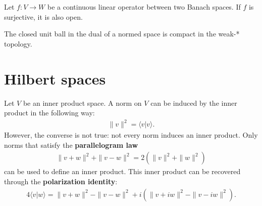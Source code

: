     \begin{theorem}
        Let $f:V\rightarrow W$ be a continuous linear operator between two Banach spaces. If $f$ is surjective, it is also open.
    \end{theorem}

    \begin{theorem}
        The closed unit ball in the dual of a normed space is compact in the weak-* topology.
    \end{theorem}


\section{Hilbert spaces}

    \begin{remark}
        Let $V$ be an inner product space. A norm on $V$ can be induced by the inner product in the following way:
        \begin{gather}
            \label{functional:inner_product_norm}
            \|v\|^2 = \langle v|v \rangle.
        \end{gather}
        However, the converse is not true: not every norm induces an inner product. Only norms that satisfy the \textbf{parallelogram law}
        \begin{gather}
            \label{functional:parallellogram_law}
            \|v+w\|^2 + \|v-w\|^2 = 2(\|v\|^2 + \|w\|^2)
        \end{gather}
        can be used to define an inner product. This inner product can be recovered through the \textbf{polarization identity}:
        \begin{gather}
            \label{functional:polarization_identity}
            4 \langle v|w \rangle = \|v+w\|^2 - \|v-w\|^2 + i\left(\|v+iw\|^2 - \|v-iw\|^2\right).
        \end{gather}
    \end{remark}

